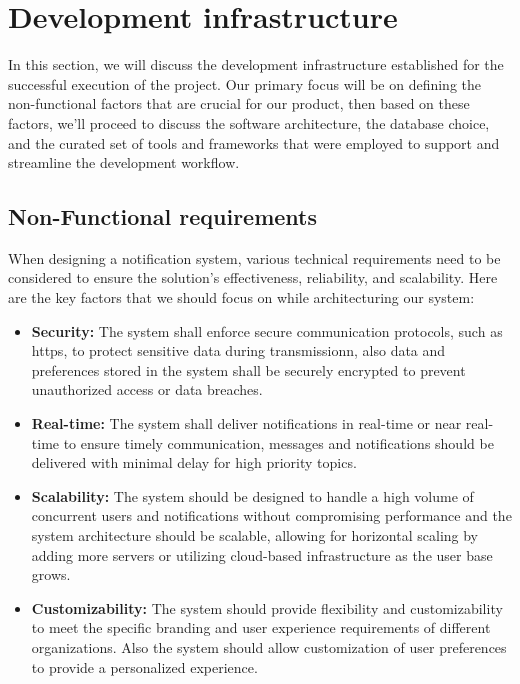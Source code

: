 \section{Development infrastructure}
In this section, we will discuss the development infrastructure established for the successful execution
of the project. Our primary focus will be on defining the non-functional factors that are crucial for our
product, then based on these factors, we'll proceed to discuss the software architecture, the database choice,
and the curated set of tools and frameworks that were employed to support and streamline the development workflow.

\subsection{Non-Functional requirements}
\label{nfr}
When designing a notification system, various technical requirements need to be considered to ensure
the solution's effectiveness, reliability, and scalability. Here are the key factors that we should
focus on while architecturing our system:

\begin{itemize}
      \item \textbf{Security:} The system shall enforce secure communication protocols, such as \acrshort{https},
            to protect sensitive data during transmissionn, also data and preferences stored in the system shall be securely
            encrypted to prevent unauthorized access or data breaches.
      \item \textbf{Real-time:} The system shall deliver notifications in real-time or near real-time
            to ensure timely communication, messages and notifications should be delivered with minimal delay for high
            priority topics.
      \item \textbf{Scalability:} The system should be designed to handle a high volume of concurrent users
            and notifications without compromising performance and the system architecture should be scalable, allowing for
            horizontal scaling by adding more servers or utilizing cloud-based infrastructure as the user base grows.
      \item \textbf{Customizability:} The system should provide flexibility and customizability to meet
            the specific branding and user experience requirements of different organizations. Also the system should
            allow customization of user preferences to provide a personalized experience.
\end{itemize}


